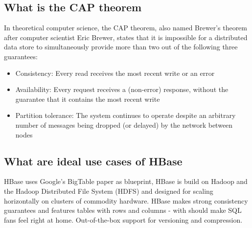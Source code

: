 \documentclass{article}
\begin{document}
\subsection{What is the CAP theorem}
In theoretical computer science, the CAP theorem, also named Brewer's theorem after computer 
scientist Eric Brewer, states that it is impossible for a distributed data store to 
simultaneously provide more than two out of the following three guarantees\cite{wiki_CAP}:
\begin{itemize}
    \item Consistency: Every read receives the most recent write or an error
    \item Availability: Every request receives a (non-error) response, without the guarantee 
    that it contains the most recent write
    \item Partition tolerance: The system continues to operate despite an arbitrary number of 
    messages being dropped (or delayed) by the network between nodes
\end{itemize}

\subsection{What are ideal use cases of HBase}
HBase uses Google's BigTable paper as blueprint, HBase is build on Hadoop and the Hadoop 
Distributed File System (HDFS) and designed for scaling horizontally on clusters of 
commodity hardware. HBase makes strong consistency guarantees and features tables with rows 
and columns - with should make SQL fans feel right at home. Out-of-the-box support for 
versioning and compression\cite{sevendbsinsevenweeks}.
\end{document}
